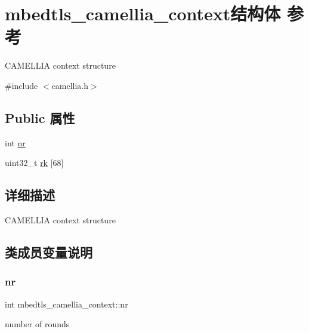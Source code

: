 \hypertarget{structmbedtls__camellia__context}{}\section{mbedtls\+\_\+camellia\+\_\+context结构体 参考}
\label{structmbedtls__camellia__context}


C\+A\+M\+E\+L\+L\+IA context structure  




{\ttfamily \#include $<$camellia.\+h$>$}

\subsection*{Public 属性}
\begin{DoxyCompactItemize}
\item 
int \hyperlink{structmbedtls__camellia__context_a63d45ee2d45dfd67ef01ad9c1ca9c8d8}{nr}
\item 
uint32\+\_\+t \hyperlink{structmbedtls__camellia__context_ab5d709c14cdfa36ac163bfd973324f19}{rk} \mbox{[}68\mbox{]}
\end{DoxyCompactItemize}


\subsection{详细描述}
C\+A\+M\+E\+L\+L\+IA context structure 

\subsection{类成员变量说明}
\mbox{\label{structmbedtls__camellia__context_a63d45ee2d45dfd67ef01ad9c1ca9c8d8}} 
\subsubsection{\texorpdfstring{nr}{nr}}
{\footnotesize\ttfamily int mbedtls\+\_\+camellia\+\_\+context\+::nr}

number of rounds \mbox{\label{structmbedtls__camellia__context_ab5d709c14cdfa36ac163bfd973324f19}} 
